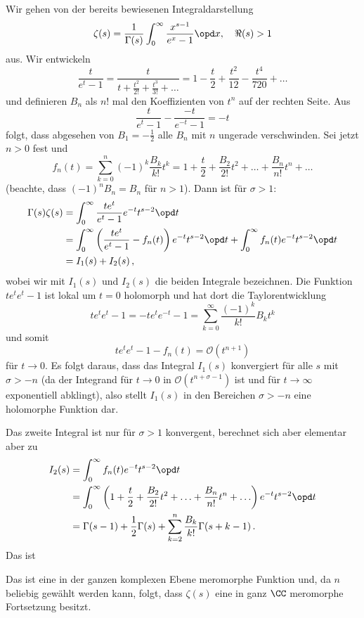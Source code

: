\begin{bewe}
Wir gehen von der bereits bewiesenen Integraldarstellung 
\[
	\zeta(s) = \frac 1{\Gamma(s)} \int_0^\infty \frac {x^{s-1}}{e^x - 1} \opd x, \quad \Re(s) > 1
\]
aus. Wir entwickeln 
\[
	\frac t{e^t - 1} = \frac t{t + \frac{t^2}{2!} + \frac {t^3}{3!} + \ldots} = 1 - \frac t2 + \frac {t^2}{12} - \frac {t^4}{720} + \ldots
\]
und definieren $B_n$ als $n!$ mal den Koeffizienten von $t^n$ auf der rechten Seite. Aus
\[
	\frac t{e^t - 1} - \frac {-t}{e^{-t} - 1} = -t
\]
folgt, dass abgesehen von $B_1 = - \frac 12$ alle $B_n$ mit $n$ ungerade verschwinden. Sei jetzt $n > 0$ fest und
\[
	f_n(t) = \sum_{k=0}^n (-1)^k \frac {B_k}{k!} t^k = 1 + \frac t2 + \frac {B_2}{2!}t^2 + \ldots + \frac {B_n}{n!}t^n + \ldots
\]
(beachte, dass $(-1)^n B_n = B_n$ für $n > 1$). Dann ist für $\sigma > 1$:
\begin{align*}
	\Gamma(s) \zeta(s) 
	&= \int_0^\infty \frac {te^t}{e^t - 1} e^{-t} t^{s-2} \opd t \\
	&= \int_0^\infty \left( \frac {te^t}{e^t - 1} - f_n(t) \right) e^{-t} t^{s-2} \opd t + \int_0^\infty f_n(t) e^{-t} t^{s-2} \opd t \\
	&= I_1(s) + I_2(s)
	\,,
\end{align*}
wobei wir mit $I_1(s)$ und $I_2(s)$ die beiden Integrale bezeichnen. Die Funktion ${te^t}{e^t - 1}$ ist lokal um $t = 0$ holomorph und hat dort die Taylorentwicklung
\[
	{te^t}{e^t - 1} = {-te^t}{e^{-t} - 1} = \sum_{k=0}^\infty \frac {(-1)^k}{k!} B_k t^k
\]
und somit 
\[
	{te^t}{e^t - 1} - f_n(t) = \mathcal O (t^{n+1})
\]
für $t \to 0$. Es folgt daraus, dass das Integral $I_1(s)$ konvergiert für alle $s$ mit $\sigma > -n$ (da der Integrand für $t \to 0$ in $\mathcal O (t^{n+\sigma-1})$ ist und für $t \to \infty$ exponentiell abklingt), also stellt $I_1(s)$ in den Bereichen $\sigma > -n$ eine holomorphe Funktion dar. 

Das zweite Integral ist nur für $\sigma > 1$ konvergent, berechnet sich aber elementar aber zu
\begin{align*}
	I_2(s) 
	&= \int_0^\infty f_n(t) e^{-t} t^{s-2} \opd t \\
	&= \int_0^\infty \left( 1 + \frac t2 + \frac {B_2}{2!}t^2 + \ldots + \frac {B_n}{n!}t^n + \ldots \right) e^{-t} t^{s-2} \opd t \\
	&= \Gamma(s-1) + \frac 12 \Gamma(s) + \sum_{k=2}^n \frac {B_k}{k!} \Gamma(s+k-1)
	\,.
\end{align*}
Das ist 
\end{bewe}

Das ist eine in der ganzen komplexen Ebene meromorphe Funktion und, da $n$ beliebig gewählt werden kann, folgt, dass $\zeta (s)$ eine in ganz $\CC$ meromorphe Fortsetzung besitzt.


